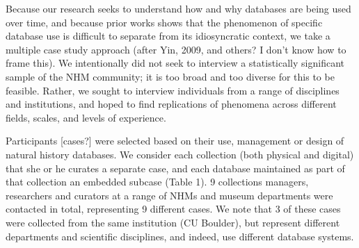 Because our research seeks to understand how and why databases are being used over time, and because prior works shows that the phenomenon of specific database use is difficult to separate from its idiosyncratic context, we take a multiple case study approach (after Yin, 2009, and others? I don’t know how to frame this).   We intentionally did not seek to interview a statistically significant sample of the NHM community; it is too broad and too diverse for this to be feasible.  Rather, we sought to interview individuals from a range of disciplines and institutions, and hoped to find replications of phenomena across different fields, scales, and levels of experience.

Participants [cases?] were selected based on their use, management or design of natural history databases. We consider each collection (both physical and digital) that she or he curates a separate case, and each database maintained as part of that collection an embedded subcase (Table 1).   9 collections managers, researchers and curators at a range of NHMs and museum departments were contacted in total, representing 9 different cases.   We note that 3 of these cases were collected from the same institution (CU Boulder), but represent different departments and scientific disciplines, and indeed, use different database systems.